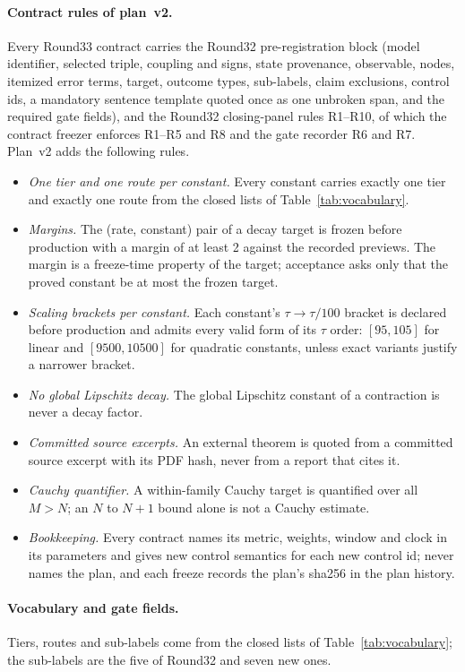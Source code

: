\paragraph{Contract rules of plan~v2.}
Every Round33 contract carries the Round32 pre-registration block (model
identifier, selected triple, coupling and signs, state provenance, observable,
nodes, itemized error terms, target, outcome types, sub-labels, claim
exclusions, control ids, a mandatory sentence template quoted once as one
unbroken span, and the required gate fields), and the Round32 closing-panel
rules R1--R10, of which the contract freezer enforces R1--R5 and R8 and the
gate recorder R6 and R7. Plan~v2 adds the following rules.
\begin{itemize}
\item \emph{One tier and one route per constant.} Every constant carries
exactly one tier and exactly one route from the closed lists of
Table~\ref{tab:vocabulary}.
\item \emph{Margins.} The (rate, constant) pair of a decay target is frozen
before production with a margin of at least 2 against the recorded previews.
The margin is a freeze-time property of the target; acceptance asks only that
the proved constant be at most the frozen target.
\item \emph{Scaling brackets per constant.} Each constant's
$\tau\to\tau/100$ bracket is declared before production and admits every valid
form of its $\tau$ order: $[95,105]$ for linear and $[9500,10500]$ for
quadratic constants, unless exact variants justify a narrower bracket.
\item \emph{No global Lipschitz decay.} The global Lipschitz constant of a
contraction is never a decay factor.
\item \emph{Committed source excerpts.} An external theorem is quoted from a
committed source excerpt with its PDF hash, never from a report that cites
it.
\item \emph{Cauchy quantifier.} A within-family Cauchy target is quantified
over all $M>N$; an $N$ to $N+1$ bound alone is not a Cauchy estimate.
\item \emph{Bookkeeping.} Every contract names its metric, weights, window
and clock in its parameters and gives new control semantics for each new
control id;  never names the plan, and each freeze
records the plan's sha256 in the plan history.
\end{itemize}

\paragraph{Vocabulary and gate fields.}
Tiers, routes and sub-labels come from the closed lists of
Table~\ref{tab:vocabulary}; the sub-labels are the five of Round32 and seven
new ones.

